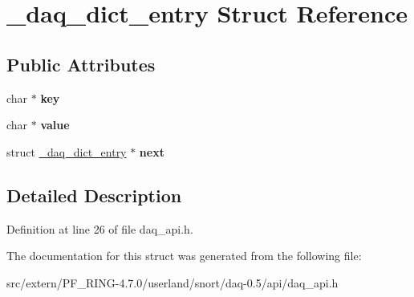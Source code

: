 \hypertarget{struct__daq__dict__entry}{
\section{\_\-daq\_\-dict\_\-entry Struct Reference}
\label{struct__daq__dict__entry}
}
\subsection*{Public Attributes}
\begin{DoxyCompactItemize}
\item 
\hypertarget{struct__daq__dict__entry_a09934f967676a3d0dba8e3574fe03541}{
char $\ast$ {\bfseries key}}
\label{struct__daq__dict__entry_a09934f967676a3d0dba8e3574fe03541}

\item 
\hypertarget{struct__daq__dict__entry_a5232490d736dc40f70c19c0d635fb065}{
char $\ast$ {\bfseries value}}
\label{struct__daq__dict__entry_a5232490d736dc40f70c19c0d635fb065}

\item 
\hypertarget{struct__daq__dict__entry_a4064dbf7dd3521a15d7b32e45f717d34}{
struct \hyperlink{struct__daq__dict__entry}{\_\-daq\_\-dict\_\-entry} $\ast$ {\bfseries next}}
\label{struct__daq__dict__entry_a4064dbf7dd3521a15d7b32e45f717d34}

\end{DoxyCompactItemize}


\subsection{Detailed Description}


Definition at line 26 of file daq\_\-api.h.



The documentation for this struct was generated from the following file:\begin{DoxyCompactItemize}
\item 
src/extern/PF\_\-RING-\/4.7.0/userland/snort/daq-\/0.5/api/daq\_\-api.h\end{DoxyCompactItemize}
